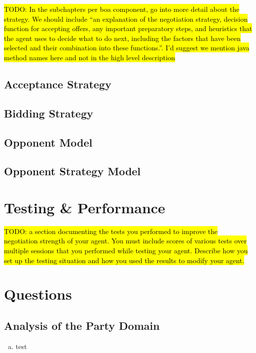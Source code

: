 \documentclass[a4paper,10pt]{article}
\newcommand{\todo}[1] {\hl{TODO: #1}}
\begin{document}
\todo{In the subchapters per boa component, go into more detail about the strategy. We should include ``an explanation of the negotiation strategy, decision function for accepting offers, any important preparatory steps, and heuristics that the agent uses to decide what to do next, including the factors that have been selected and their combination into these functions.''.
I'd suggest we mention java method names here and not in the high level description}

\subsection{Acceptance Strategy}
\label{sec:strategyAS}

\subsection{Bidding Strategy}
\label{sec:strategyBS}

\subsection{Opponent Model}
\label{sec:strategyOM}

\subsection{Opponent Strategy Model}
\label{sec:strategyOMS}

\section{Testing \& Performance}
\label{sec:performance}
\todo{a section documenting the tests you performed to improve the negotiation strength of your agent. You must include scores of various tests over multiple sessions that you performed while testing your agent. Describe how you set up the testing situation and how you used the results to modify your agent.}

\section{Questions}
\label{sec:questions}

\subsection{Analysis of the Party Domain}

\begin{enumerate}[(a)]

\item{test}

\end{enumerate}
\end{document}
